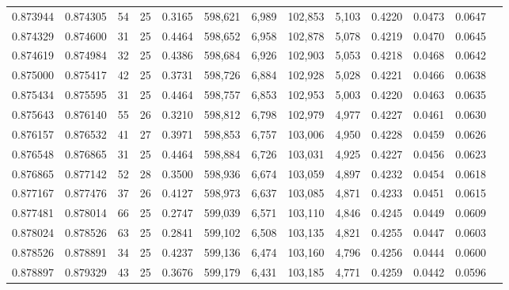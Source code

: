 \begin{tabular}{rrrrrrrrrrrrr}
0.873944 & 0.874305 &    54 &  25 &                                     0.3165 & 598,621 &   6,989 & 102,853 &   5,103 & 0.4220 & 0.0473 & 0.0647 \\
0.874329 & 0.874600 &    31 &  25 &                                     0.4464 & 598,652 &   6,958 & 102,878 &   5,078 & 0.4219 & 0.0470 & 0.0645 \\
0.874619 & 0.874984 &    32 &  25 &                                     0.4386 & 598,684 &   6,926 & 102,903 &   5,053 & 0.4218 & 0.0468 & 0.0642 \\
0.875000 & 0.875417 &    42 &  25 &                                     0.3731 & 598,726 &   6,884 & 102,928 &   5,028 & 0.4221 & 0.0466 & 0.0638 \\
0.875434 & 0.875595 &    31 &  25 &                                     0.4464 & 598,757 &   6,853 & 102,953 &   5,003 & 0.4220 & 0.0463 & 0.0635 \\
0.875643 & 0.876140 &    55 &  26 &                                     0.3210 & 598,812 &   6,798 & 102,979 &   4,977 & 0.4227 & 0.0461 & 0.0630 \\
0.876157 & 0.876532 &    41 &  27 &                                     0.3971 & 598,853 &   6,757 & 103,006 &   4,950 & 0.4228 & 0.0459 & 0.0626 \\
0.876548 & 0.876865 &    31 &  25 &                                     0.4464 & 598,884 &   6,726 & 103,031 &   4,925 & 0.4227 & 0.0456 & 0.0623 \\
0.876865 & 0.877142 &    52 &  28 &                                     0.3500 & 598,936 &   6,674 & 103,059 &   4,897 & 0.4232 & 0.0454 & 0.0618 \\
0.877167 & 0.877476 &    37 &  26 &                                     0.4127 & 598,973 &   6,637 & 103,085 &   4,871 & 0.4233 & 0.0451 & 0.0615 \\
0.877481 & 0.878014 &    66 &  25 &                                     0.2747 & 599,039 &   6,571 & 103,110 &   4,846 & 0.4245 & 0.0449 & 0.0609 \\
0.878024 & 0.878526 &    63 &  25 &                                     0.2841 & 599,102 &   6,508 & 103,135 &   4,821 & 0.4255 & 0.0447 & 0.0603 \\
0.878526 & 0.878891 &    34 &  25 &                                     0.4237 & 599,136 &   6,474 & 103,160 &   4,796 & 0.4256 & 0.0444 & 0.0600 \\
0.878897 & 0.879329 &    43 &  25 &                                     0.3676 & 599,179 &   6,431 & 103,185 &   4,771 & 0.4259 & 0.0442 & 0.0596 \\

\end{tabular}
